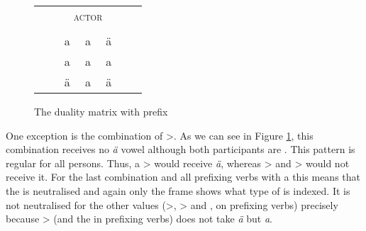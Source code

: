 \begin{figure}

	\begin{tabular}{|ccccccc|}
		\cline{3-5}
		\multicolumn{2}{c|}{}&\multicolumn{3}{c|}{\textsc{actor}}&\\\cline{3-5}
		\multicolumn{2}{c|}{}&\multicolumn{1}{c}{\Sg}&\multicolumn{1}{|c|}{\Du}&\multicolumn{1}{c|}{\Pl}&\\\cline{1-5}
		{\parbox[t]{2mm}{}}&\multicolumn{1}{|c|}{\parbox[t]{2mm}{}}&\multicolumn{1}{c}{\multirow{2}{*}{\,a\,}}	&\multirow{2}{*}{\,a\,}	&\multicolumn{1}{c|}{\multirow{2}{*}{\,ä\,}}&\\
		&\multicolumn{1}{|c|}{}&&&\multicolumn{1}{c|}{}\\\cline{2-2}
		&\multicolumn{1}{|c|}{\parbox[t]{2mm}{}}&\multicolumn{1}{c}{\multirow{2}{*}{\,a\,}}&\multirow{2}{*}{\,a\,}&\multicolumn{1}{c|}{\multirow{2}{*}{\,a\,}}&\\
		&\multicolumn{1}{|c|}{}&&&\multicolumn{1}{c|}{}\\\cline{2-2}
		&\multicolumn{1}{|c|}{\parbox[t]{2mm}{}}&\multicolumn{1}{c}{\multirow{2}{*}{\,ä\,}}&\multirow{2}{*}{\,a\,}&\multicolumn{1}{c|}{\multirow{2}{*}{\,ä\,}}&\\
		&\multicolumn{1}{|c|}{}&&&\multicolumn{1}{c|}{}\\\cline{1-5}
	\end{tabular}
\caption{The duality matrix with \Vc{} prefix}
\label{raezeroraevalchange}
\end{figure}%

One exception is the combination of \Sg>\Sg{}. As we can see in Figure \ref{raezeroraevalchange}, this combination receives no \emph{ä} vowel although both participants are . This pattern is regular for all persons. Thus, a \Pl>\Tsg{} would receive \emph{ä}, whereas \Du>\Tsg{} and \Sg>\Tsg{} would not receive it. For the last combination and all prefixing verbs with a \Tsg{} this means that the  is neutralised and again only the  frame shows what type of  is indexed. It is not neutralised for the other  values (\Sg>\Fsg{}, \Sg>\Ssg{} and \Fsg{}, \Ssg{} on prefixing verbs) precisely because \Sg>\Sg{} (and the \Sg{} in prefixing verbs) does not take \emph{ä} but \emph{a}.%

